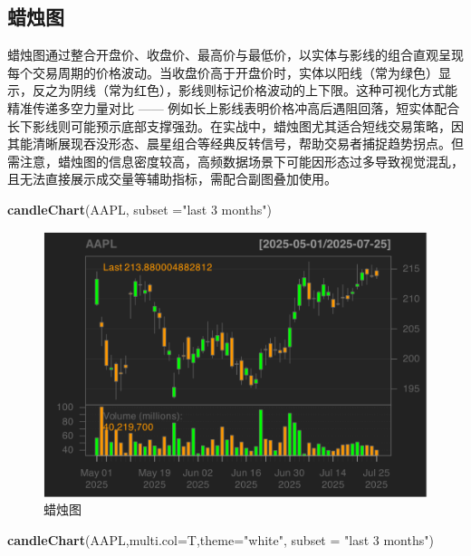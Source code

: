 \documentclass[]{ctexbook}
\newenvironment{Shaded}{\begin{snugshade}}{\end{snugshade}}
\newcommand{\AttributeTok}[1]{\textcolor[rgb]{0.13,0.29,0.53}{#1}}
\newcommand{\FunctionTok}[1]{\textcolor[rgb]{0.13,0.29,0.53}{\textbf{#1}}}
\newcommand{\NormalTok}[1]{#1}
\newcommand{\StringTok}[1]{\textcolor[rgb]{0.31,0.60,0.02}{#1}}
\begin{document}
\subsection{蜡烛图}\label{ux8721ux70dbux56fe}

蜡烛图通过整合开盘价、收盘价、最高价与最低价，以实体与影线的组合直观呈现每个交易周期的价格波动。当收盘价高于开盘价时，实体以阳线（常为绿色）显示，反之为阴线（常为红色），影线则标记价格波动的上下限。这种可视化方式能精准传递多空力量对比 ------ 例如长上影线表明价格冲高后遇阻回落，短实体配合长下影线则可能预示底部支撑强劲。在实战中，蜡烛图尤其适合短线交易策略，因其能清晰展现吞没形态、晨星组合等经典反转信号，帮助交易者捕捉趋势拐点。但需注意，蜡烛图的信息密度较高，高频数据场景下可能因形态过多导致视觉混乱，且无法直接展示成交量等辅助指标，需配合副图叠加使用。

\begin{Shaded}
\begin{Highlighting}[]
\FunctionTok{candleChart}\NormalTok{(AAPL, }\AttributeTok{subset =}\StringTok{"last 3 months"}\NormalTok{)}
\end{Highlighting}
\end{Shaded}

\begin{figure}
\includegraphics[width=0.9\linewidth]{QuantmodHandbook_files/figure-latex/candle-1} \caption{蜡烛图}\label{fig:candle}
\end{figure}

\begin{Shaded}
\begin{Highlighting}[]
\FunctionTok{candleChart}\NormalTok{(AAPL,}\AttributeTok{multi.col=}\NormalTok{T,}\AttributeTok{theme=}\StringTok{"white"}\NormalTok{, }\AttributeTok{subset =} \StringTok{"last 3 months"}\NormalTok{)}
\end{Highlighting}
\end{Shaded}
\end{document}
